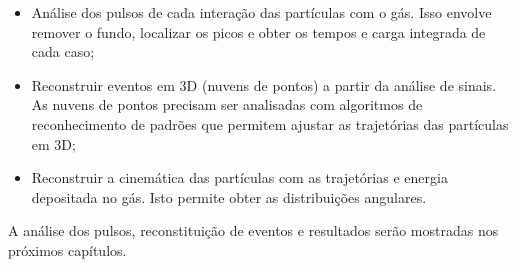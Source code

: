 \documentclass[a4paper,12pt,oneside]{book}
\begin{document}

\begin{itemize}
    \item Análise dos pulsos de cada interação das partículas com o gás. Isso envolve remover o fundo, localizar os picos e obter os tempos e carga integrada de cada caso;
    \item Reconstruir eventos em 3D (nuvens de pontos) a partir da análise de sinais. As nuvens de pontos precisam ser analisadas com algoritmos de reconhecimento de padrões que permitem ajustar as trajetórias das partículas em 3D;
    \item Reconstruir a cinemática das partículas com as trajetórias e energia depositada no gás. Isto permite obter as distribuições angulares. 
\end{itemize}


A análise dos pulsos, reconstituição de eventos e resultados serão mostradas nos próximos capítulos.

\end{document}
